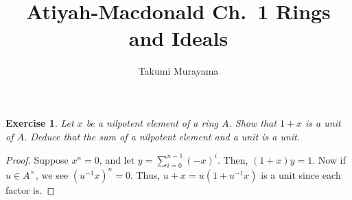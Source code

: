 \documentclass[12pt,letterpaper]{article}
\title{Atiyah-Macdonald Ch.~1 Rings and Ideals}
\author{Takumi Murayama}
\newtheorem{problem}{Exercise}[section]
\theoremstyle{definition}
\theoremstyle{remark}
\numberwithin{figure}{problem}
\numberwithin{equation}{section}
\begin{document}
\maketitle
\setcounter{section}{1}
\begin{problem}\label{exc:1.1}
  Let $x$ be a nilpotent element of a ring $A$. Show that $1 + x$ is a unit of $A$. Deduce that the sum of a nilpotent element and a unit is a unit.
\end{problem}
\begin{proof}
  Suppose $x^n = 0$, and let $y = \sum_{i=0}^{n-1} (-x)^i$. Then, $(1+x)y = 1$. Now if $u \in A^\times$, we see $(u^{-1}x)^n = 0$. Thus, $u+x = u(1+u^{-1}x)$ is a unit since each factor is.
\end{proof}
\end{document}
